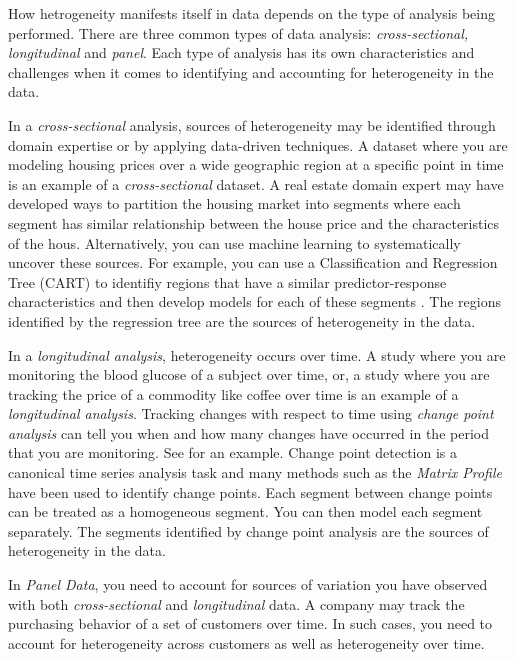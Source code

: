 \documentclass{article}
\begin{document}
How hetrogeneity manifests itself in data depends on the type of analysis being performed. There are three common types of data analysis: \emph{cross-sectional, longitudinal} and \emph{panel}. Each type of analysis has its own characteristics and challenges when it comes to identifying and accounting for heterogeneity in the data.

In a \emph{cross-sectional} analysis, sources of heterogeneity may be identified through domain expertise or by applying data-driven techniques. A dataset where you are modeling housing prices over a wide geographic region at a specific point in time is an example of a \emph{cross-sectional} dataset. A real estate domain expert may have developed ways to partition the housing market into segments where each segment has similar relationship between the house price and the characteristics of the hous. Alternatively, you can use machine learning to systematically uncover these sources. For example, you can use a Classification and Regression Tree (CART)\cite{breiman2017classification} to identifiy regions that have a similar predictor-response characteristics and then develop models for each of these segments \cite{sambasivan2019classification}. The regions identified by the regression tree are the sources of heterogeneity in the data.

In a \emph{longitudinal analysis}, heterogeneity occurs over time. A study where you are monitoring the blood glucose of a subject over time, or, a study where you are tracking the price of a commodity like coffee over time is an example of a \emph{longitudinal analysis}. Tracking changes with respect to time using \emph{change point analysis} can tell you when and how many changes have occurred in the period that you are monitoring. See \cite{sambasivan2025_long} for an example. Change point detection is a canonical time series analysis task and many methods such as the \emph{Matrix Profile}\cite{yeh2016matrix} have been used to identify change points. Each segment between change points can be treated as a homogeneous segment. You can then model each segment separately. The segments identified by change point analysis are the sources of heterogeneity in the data.

In \emph{Panel Data}, you need to account for sources of variation you have observed with both \emph{cross-sectional} and \emph{longitudinal} data. A company may track the purchasing behavior of a set of customers over time. In such cases, you need to account for heterogeneity across customers as well as heterogeneity over time.
\end{document}
